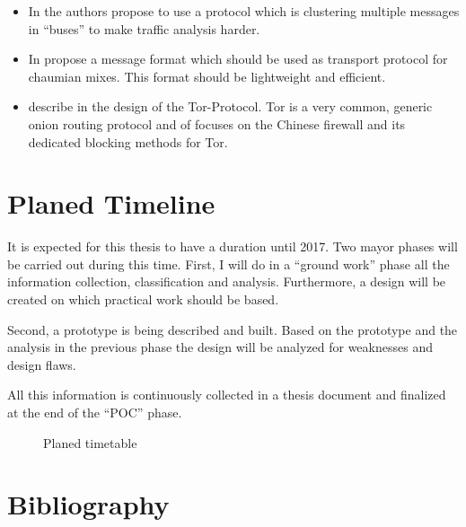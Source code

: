 \documentclass[twocolumn,a4paper,10pt,english]{scrartcl}
\begin{document}
\begin{itemize}
\item In \cite{buses03} the authors \citeauthor{buses03} propose to use a protocol which is clustering multiple messages in ``buses'' to make traffic analysis harder.
\item In \cite{danezis:wpes2004} \citeauthor{danezis:wpes2004} propose a message format which should be used as transport protocol for chaumian mixes. This format should be lightweight and efficient.
\item \citeauthor{tor-design} describe in \cite{tor-design} the design of the Tor-Protocol. Tor is a very common, generic onion routing protocol and \cite{foci12-winter} of \citeauthor{foci12-winter} focuses on the Chinese firewall and its dedicated blocking methods for Tor.
\end{itemize}

\section{Planed Timeline}
It is expected for this thesis to have a duration until 2017. Two mayor phases will be carried out during this time. First, I will do in a ``ground work'' phase all the information collection, classification and analysis. Furthermore, a design will be created on which practical work should be based.\par

Second, a prototype is being described and built. Based on the prototype and the analysis in the previous phase the design will be analyzed for weaknesses and design flaws.\par
All this information is continuously collected in a thesis document and finalized at the end of the ``POC'' phase.\par
\begin{figure}[H]%
\caption{Planed timetable}%
\label{Gant chart}%
\end{figure}

\section{Bibliography}
\printbibliography[title={},heading=none]
\end{document}

